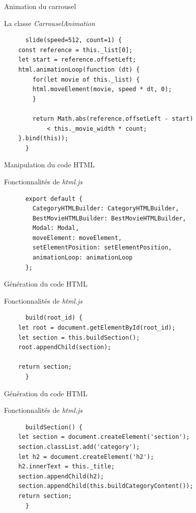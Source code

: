 \begin{frame}[fragile]{Animation du carrousel}

  \begin{block}{La classe \textit{CarrouselAnimation}}
    \small
    \begin{verbatim}
      slide(speed=512, count=1) {
	const reference = this._list[0];
	let start = reference.offsetLeft;	
	html.animationLoop(function (dt) {
	    for(let movie of this._list) {
		html.moveElement(movie, speed * dt, 0);
	    }
	    
	    return Math.abs(reference.offsetLeft - start)
            < this._movie_width * count;
	}.bind(this));
      }
    \end{verbatim}
  \end{block}
\end{frame}

\begin{frame}[fragile]{Manipulation du code HTML}
  \begin{block}{Fonctionnalités de \textit{html.js}}
    \begin{verbatim}
      export default {
        CategoryHTMLBuilder: CategoryHTMLBuilder,
        BestMovieHTMLBuilder: BestMovieHTMLBuilder,
        Modal: Modal,
        moveElement: moveElement,
        setElementPosition: setElementPosition,
        animationLoop: animationLoop
      };
    \end{verbatim}
  \end{block}
\end{frame}

\begin{frame}[fragile]{Génération du code HTML}
  \begin{block}{Fonctionnalités de \textit{html.js}}
    \begin{verbatim}
      build(root_id) {
	let root = document.getElementById(root_id);
	let section = this.buildSection();
	root.appendChild(section);

	return section;
      }
    \end{verbatim}
  \end{block}
\end{frame}

\begin{frame}[fragile]{Génération du code HTML}
  \begin{block}{Fonctionnalités de \textit{html.js}}
    \small
    \begin{verbatim}
      buildSection() {
	let section = document.createElement('section');
	section.classList.add('category');	
	let h2 = document.createElement('h2');
	h2.innerText = this._title;
	section.appendChild(h2);
	section.appendChild(this.buildCategoryContent());	
	return section;
      }
    \end{verbatim}
  \end{block}
\end{frame}

